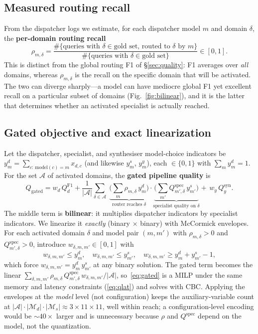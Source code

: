 \documentclass[11pt]{article}
\begin{document}
\subsection{Measured routing recall}
From the dispatcher logs we estimate, for each dispatcher model $m$ and domain
$\delta$, the \textbf{per-domain routing recall}
\begin{equation}
\rho_{m,\delta}=\frac{\#\{\text{queries with }\delta\in\text{gold set, routed to }\delta\text{ by }m\}}
{\#\{\text{queries with }\delta\in\text{gold set}\}}\in[0,1].
\label{eq:recall}
\end{equation}
This is distinct from the global routing F1 of §\ref{sec:quality}: F1 averages over
\emph{all} domains, whereas $\rho_{m,\delta}$ is the recall on the specific domain
that will be activated. The two can diverge sharply---a model can have mediocre
global F1 yet excellent recall on a particular subset of domains
(Fig.~\ref{fig:bilinear}), and it is the latter that determines whether an
activated specialist is actually reached.

\subsection{Gated objective and exact linearization}
Let the dispatcher, specialist, and synthesiser model-choice indicators be
$y^{d}_{m}=\sum_{c:\,\mathrm{model}(c)=m}x_{d,c}$ (and likewise $y^{s}_{m}$,
$y^{y}_{m}$), each $\in\{0,1\}$ with $\sum_m y^{d}_m=1$. For the set $\mathcal A$
of activated domains, the \textbf{gated pipeline quality} is
\begin{equation}
Q_{\mathrm{gated}}=
w_d\, Q^{\mathrm{F1}}_{d}
+\frac{1}{|\mathcal A|}\sum_{\delta\in\mathcal A}\;
\underbrace{\Big(\sum_{m}\rho_{m,\delta}\,y^{d}_{m}\Big)}_{\text{router reaches }\delta}
\cdot
\underbrace{\Big(\sum_{m'}Q^{\mathrm{spec}}_{m',\delta}\,y^{s}_{m'}\Big)}_{\text{specialist quality on }\delta}
+\,w_y\, Q^{\mathrm{syn}}_{y}.
\label{eq:gated}
\end{equation}
The middle term is \textbf{bilinear}: it multiplies dispatcher indicators by
specialist indicators. We linearize it \emph{exactly} (binary $\times$ binary)
with McCormick envelopes. For each activated domain $\delta$ and model pair
$(m,m')$ with $\rho_{m,\delta}>0$ and $Q^{\mathrm{spec}}_{m',\delta}>0$, introduce
$w_{\delta,m,m'}\in[0,1]$ with
\begin{equation}
w_{\delta,m,m'}\le y^{d}_{m},\quad
w_{\delta,m,m'}\le y^{s}_{m'},\quad
w_{\delta,m,m'}\ge y^{d}_{m}+y^{s}_{m'}-1,
\label{eq:mccormick}
\end{equation}
which force $w_{\delta,m,m'}=y^{d}_{m}\,y^{s}_{m'}$ at any binary solution. The
gated term becomes the linear
$\sum_{\delta,m,m'}\rho_{m,\delta}\,Q^{\mathrm{spec}}_{m',\delta}\,w_{\delta,m,m'}/|\mathcal A|$,
so~\eqref{eq:gated} is a MILP under the same memory and latency constraints
(\eqref{eq:qlat}) and solves with CBC. Applying the envelopes at the
\emph{model} level (not configuration) keeps the auxiliary-variable count at
$|\mathcal A|\cdot|\mathcal M_d|\cdot|\mathcal M_s|\!\approx\!3\times11\times11$,
well within reach; a configuration-level encoding would be $\sim$$40\times$ larger
and is unnecessary because $\rho$ and $Q^{\mathrm{spec}}$ depend on the model, not
the quantization.
\end{document}
